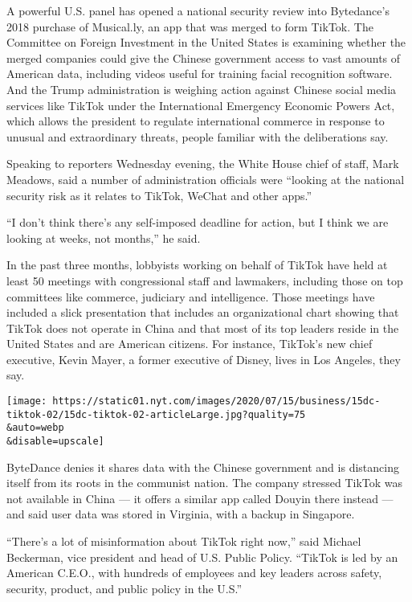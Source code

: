 A powerful U.S. panel has opened a national security review into
Bytedance's 2018 purchase of Musical.ly, an app that was merged to form
TikTok. The Committee on Foreign Investment in the United States is
examining whether the merged companies could give the Chinese government
access to vast amounts of American data, including videos useful for
training facial recognition software. And the Trump administration is
weighing action against Chinese social media services like TikTok under
the International Emergency Economic Powers Act, which allows the
president to regulate international commerce in response to unusual and
extraordinary threats, people familiar with the deliberations say.

Speaking to reporters Wednesday evening, the White House chief of staff,
Mark Meadows, said a number of administration officials were ``looking
at the national security risk as it relates to TikTok, WeChat and other
apps.''

``I don't think there's any self-imposed deadline for action, but I
think we are looking at weeks, not months,'' he said.

In the past three months, lobbyists working on behalf of TikTok have
held at least 50 meetings with congressional staff and lawmakers,
including those on top committees like commerce, judiciary and
intelligence. Those meetings have included a slick presentation that
includes an organizational chart showing that TikTok does not operate in
China and that most of its top leaders reside in the United States and
are American citizens. For instance, TikTok's new chief executive, Kevin
Mayer, a former executive of Disney, lives in Los Angeles, they say.

\texttt{[image: https://static01.nyt.com/images/2020/07/15/business/15dc-tiktok-02/15dc-tiktok-02-articleLarge.jpg?quality=75\\\&auto=webp\\\&disable=upscale]}

ByteDance denies it shares data with the Chinese government and is
distancing itself from its roots in the communist nation. The company
stressed TikTok was not available in China --- it offers a similar app
called Douyin there instead --- and said user data was stored in
Virginia, with a backup in Singapore.

``There's a lot of misinformation about TikTok right now,'' said Michael
Beckerman, vice president and head of U.S. Public Policy. ``TikTok is
led by an American C.E.O., with hundreds of employees and key leaders
across safety, security, product, and public policy in the U.S.''

